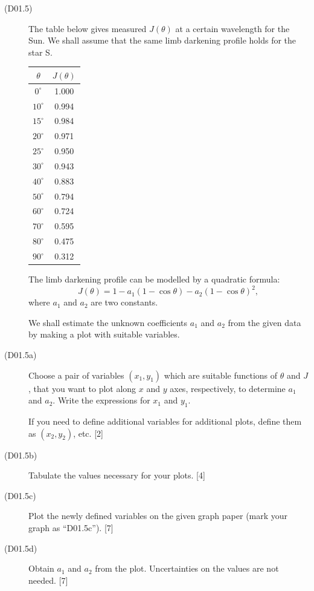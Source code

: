 \begin{description}
\item[(D01.5)] The table below gives measured $J(\theta)$ at a certain
  wavelength for the Sun. We shall assume that the same limb darkening profile
  holds for the star S.

  \begin{center}
  \begin{tabular}{cc}
  \toprule
  $\theta$ & $J(\theta)$\\
  \midrule
  $0^\circ$  & 1.000\\
  $10^\circ$ & 0.994\\
  $15^\circ$ & 0.984\\
  $20^\circ$ & 0.971\\
  $25^\circ$ & 0.950\\
  $30^\circ$ & 0.943\\
  $40^\circ$ & 0.883\\
  $50^\circ$ & 0.794\\
  $60^\circ$ & 0.724\\
  $70^\circ$ & 0.595\\
  $80^\circ$ & 0.475\\
  $90^\circ$ & 0.312\\
  \bottomrule
  \end{tabular}
  \end{center}

  The limb darkening profile can be modelled by a quadratic formula:
  \[
  J(\theta) = 1 - a_1(1-\cos\theta) - a_2(1-\cos\theta)^2,
  \]
  where $a_1$ and $a_2$ are two constants.

  We shall estimate the unknown coefficients $a_1$ and $a_2$ from the given
  data by making a plot with suitable variables.
\item[(D01.5a)] Choose a pair of variables $(x_1, y_1)$ which are suitable
  functions of $\theta$ and $J$, that you want to plot along $x$ and $y$ axes,
  respectively, to determine $a_1$ and $a_2$. Write the expressions for $x_1$
  and $y_1$.

  If you need to define additional variables for additional plots, define them
  as $(x_2, y_2)$, etc. \hfill[2]
\item[(D01.5b)] Tabulate the values necessary for your plots. \hfill[4]
\item[(D01.5c)] Plot the newly defined variables on the given graph paper
  (mark your graph as ``D01.5c''). \hfill[7]
\item[(D01.5d)] Obtain $a_1$ and $a_2$ from the plot. Uncertainties on the
  values are not needed. \hfill[7]
\end{description}

